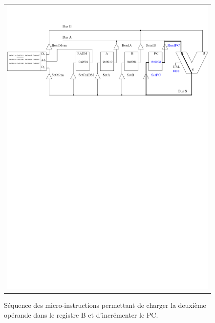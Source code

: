 \begin{figure}[htbp]
\begin{tabular}{c}
\includegraphics[width=\linewidth]{Figs/premier_chemin_ldb_3.pdf}
\end{tabular}
\caption{\label{fig:premier_chemin_ldb} Séquence des micro-instructions permettant de charger la deuxième opérande dans le registre B et d'incrémenter le PC.}
\end{figure}


